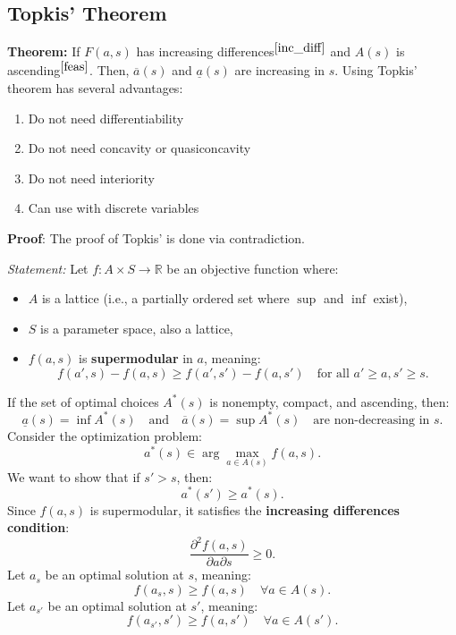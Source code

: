 \documentclass{article}
\begin{document}
\subsection{Topkis' Theorem}
\textbf{Theorem:} If $F(a,s)$ has increasing differences$^{\ref{inc_diff}}$ and $A(s)$ is ascending$^{\ref{feas}}$. Then, $\overline{a}(s)$ and $\underline{a}(s)$ are increasing in $s$. Using Topkis' theorem has several advantages:
\begin{enumerate}
    \item Do not need differentiability
    \item Do not need concavity or quasiconcavity
    \item Do not need interiority
    \item Can use with discrete variables
\end{enumerate}
\vspace{.2cm}

\noindent\textbf{Proof}: The proof of Topkis' is done via contradiction.

\textit{Statement:}  
Let \( f: A \times S \to \mathbb{R} \) be an objective function where:
\begin{itemize}
    \item \( A \) is a lattice (i.e., a partially ordered set where \(\sup\) and \(\inf\) exist),
    \item \( S \) is a parameter space, also a lattice,
    \item \( f(a, s) \) is \textbf{supermodular} in \( a \), meaning:
    \[
    f(a', s) - f(a, s) \geq f(a', s') - f(a, s') \quad \text{for all } a' \geq a, s' \geq s.
    \]
\end{itemize}
If the set of optimal choices \( A^*(s) \) is nonempty, compact, and ascending, then:
\[
\underline{a}(s) = \inf A^*(s) \quad \text{and} \quad \overline{a}(s) = \sup A^*(s) \quad \text{are non-decreasing in } s.
\]
Consider the optimization problem: 
\[
a^*(s) \in \arg\max_{a \in A(s)} f(a, s).
\]
We want to show that if \( s' > s \), then:
\[
a^*(s') \geq a^*(s).
\]
Since \( f(a, s) \) is supermodular, it satisfies the \textbf{increasing differences condition}:
\[
\frac{\partial^2 f(a, s)}{\partial a \partial s} \geq 0.
\]
Let \( a_s \) be an optimal solution at \( s \), meaning:
\[
f(a_s, s) \geq f(a, s) \quad \forall a \in A(s).
\]
Let \( a_{s'} \) be an optimal solution at \( s' \), meaning:
\[
f(a_{s'}, s') \geq f(a, s') \quad \forall a \in A(s').
\]
\end{document}
